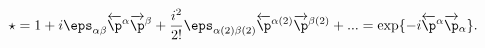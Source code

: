\begin{equation}
\star=1+i\eps_{\alpha\beta}
\overleftarrow{\p}^\alpha\overrightarrow{\p}^\beta+
\frac{i^2}{2!}\eps_{\alpha(2)\beta(2)}
\overleftarrow{\p}^{\alpha(2)}\overrightarrow{\p}^{\beta(2)}+...=
\exp\{-i\overleftarrow{\p}^\alpha\overrightarrow{\p}_\alpha\}.
\end{equation}

